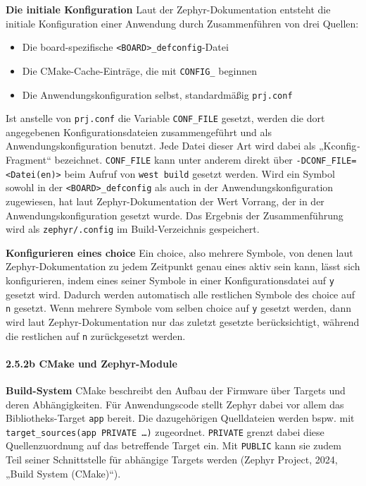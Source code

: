 \textbf{Die initiale Konfiguration} Laut der Zephyr-Dokumentation entsteht die initiale Konfiguration einer Anwendung durch Zusammenführen von drei Quellen:

\begin{itemize}
\item Die board-spezifische \lstinline[style=fileinline]|<BOARD>_defconfig|-Datei
\item Die CMake-Cache-Einträge, die mit \lstinline[style=fileinline]|CONFIG_| beginnen
\item Die Anwendungskonfiguration selbst, standardmäßig \lstinline[style=fileinline]|prj.conf|
\end{itemize}
Ist anstelle von \lstinline[style=fileinline]|prj.conf| die Variable \lstinline[style=fileinline]|CONF_FILE| gesetzt, werden die dort angegebenen Konfigurationsdateien zusammengeführt und als Anwendungskonfiguration benutzt. Jede Datei dieser Art wird dabei als „Kconfig\emph{-}Fragment“ bezeichnet. \lstinline[style=fileinline]|CONF_FILE| kann unter anderem direkt über \lstinline[style=fileinline]|-DCONF_FILE=<Datei(en)>| beim Aufruf von \lstinline[style=fileinline]|west build| gesetzt werden. Wird ein Symbol sowohl in der \lstinline[style=fileinline]|<BOARD>_defconfig| als auch in der Anwendungskonfiguration zugewiesen, hat laut Zephyr-Dokumentation der  Wert Vorrang, der in der Anwendungskonfiguration gesetzt wurde. Das Ergebnis der Zusammenführung wird als \lstinline[style=fileinline]|zephyr/.config| im Build-Verzeichnis gespeichert.

\textbf{Konfigurieren eines choice} Ein choice, also mehrere Symbole, von denen laut Zephyr-Dokumentation zu jedem Zeitpunkt genau eines aktiv sein kann, lässt sich konfigurieren, indem eines seiner Symbole in einer Konfigurationsdatei auf \lstinline[style=fileinline]|y| gesetzt wird. Dadurch werden automatisch alle restlichen Symbole des choice auf \lstinline[style=fileinline]|n| gesetzt. Wenn mehrere Symbole vom selben choice auf \lstinline[style=fileinline]|y| gesetzt werden, dann wird laut Zephyr-Dokumentation nur das zuletzt gesetzte berücksichtigt, während die restlichen auf \lstinline[style=fileinline]|n| zurückgesetzt werden.

\paragraph*{\textbf{2.5.2b CMake und Zephyr-Module}}
\textbf{Build-System} CMake beschreibt den Aufbau der Firmware über Targets und deren Abhängigkeiten. Für Anwendungscode stellt Zephyr dabei vor allem das Bibliotheks-Target \lstinline[style=fileinline]|app| bereit. Die dazugehörigen Quelldateien werden bspw. mit \lstinline[style=fileinline]|target_sources(app PRIVATE …)| zugeordnet. \lstinline[style=fileinline]|PRIVATE| grenzt dabei diese Quellenzuordnung auf das betreffende Target ein. Mit \lstinline[style=fileinline]|PUBLIC| kann sie zudem Teil seiner Schnittstelle für abhängige Targets werden (Zephyr Project, 2024, „Build System (CMake)“).

